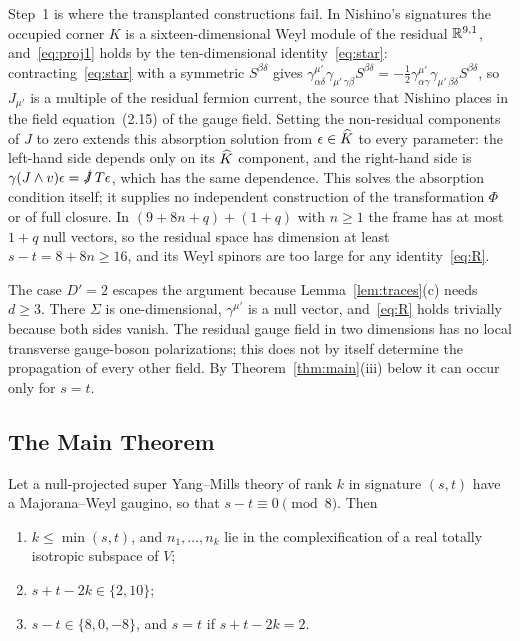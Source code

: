 Step~1 is where the transplanted constructions fail. In Nishino's signatures the occupied corner $K$ is a sixteen-dimensional Weyl module of the residual $\mathbb{R}^{9,1}$, and~\eqref{eq:proj1} holds by the ten-dimensional identity~\eqref{eq:star}: contracting~\eqref{eq:star} with a symmetric $S^{\beta\delta}$ gives $\gamma^{\mu'}_{\alpha\delta}\gamma_{\mu'\,\gamma\beta}S^{\beta\delta}=-\frac12\gamma^{\mu'}_{\alpha\gamma}\gamma_{\mu'\,\beta\delta}S^{\beta\delta}$, so $J_{\mu'}$ is a multiple of the residual fermion current, the source that Nishino places in the field equation~(2.15) of the gauge field. Setting the non-residual components of $J$ to zero extends this absorption solution from $\epsilon\in\widehat{K}$ to every parameter: the left-hand side depends only on its $\widehat{K}$ component, and the right-hand side is $\gamma(J\wedge v)\epsilon=\slashed J\,T\epsilon$, which has the same dependence. This solves the absorption condition itself; it supplies no independent construction of the transformation $\Phi$ or of full closure. In $(9+8n+q)+(1+q)$ with $n\ge1$ the frame has at most $1+q$ null vectors, so the residual space has dimension at least $s-t=8+8n\ge16$, and its Weyl spinors are too large for any identity~\eqref{eq:R}.

\begin{remark}
\label{rem:D2}
The case $D'=2$ escapes the argument because Lemma~\ref{lem:traces}(c) needs $d\ge3$. There $\Sigma$ is one-dimensional, $\gamma^{\mu'}$ is a null vector, and~\eqref{eq:R} holds trivially because both sides vanish. The residual gauge field in two dimensions has no local transverse gauge-boson polarizations; this does not by itself determine the propagation of every other field. By Theorem~\ref{thm:main}(iii) below it can occur only for $s=t$.
\end{remark}

\subsection{The Main Theorem}
\label{sec:main}

\begin{theorem}
\label{thm:main}
Let a null-projected super Yang--Mills theory of rank $k$ in signature $(s,t)$ have a Majorana--Weyl gaugino, so that $s-t\equiv0\pmod 8$. Then
\begin{enumerate}[label=(\roman*)]
\item $k\le\min(s,t)$, and $n_1,\dots,n_k$ lie in the complexification of a real totally isotropic subspace of $V$;
\item $s+t-2k\in\{2,10\}$;
\item $s-t\in\{8,0,-8\}$, and $s=t$ if $s+t-2k=2$.
\end{enumerate}
\end{theorem}

